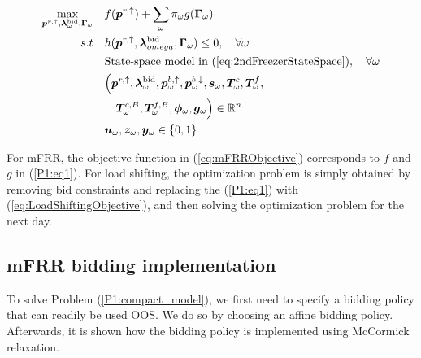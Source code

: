 \begin{subequations}\label{P1:compact_model}
    \begin{align}
        \underset{\bm{p}^{r,\uparrow}, \bm{\lambda}_{\omega}^{\text{bid}}, \bm{\Gamma}_{\omega}}{\textrm{max}} \quad & f(\bm{p}^{r,\uparrow}) + \sum_{\omega} \pi_{\omega} g(\bm{\Gamma}_{\omega}) \label{P1:eq1}
        \\
        s.t \quad                                                                                                    & h(\bm{p}^{r,\uparrow}, \bm{\lambda}_{omega}^{\text{bid}}, \bm{\Gamma}_{\omega}) \leq 0, \quad \forall{\omega}\label{P1:eq2}                                                                     \\
        \quad                                                                                                        & \text{State-space model in } (\ref{eq:2ndFreezerStateSpace}), \quad \forall{\omega} \label{P1:eq3}
        \\
        \quad                                                                                                        & \Bigl( \bm{p}^{r,\uparrow}, \bm{\lambda}_{\omega}^{\text{bid}}, \bm{p}_{\omega}^{b,\uparrow}, \bm{p}_{\omega}^{b,\downarrow}, \bm{s}_{\omega}, \bm{T}_{\omega}^{c}, \bm{T}_{\omega}^{f}, \notag \\ \quad & \quad \bm{T}_{\omega}^{c, B}, \bm{T}_{\omega}^{f,B}, \bm{\phi}_{\omega}, \bm{g}_{\omega} \Bigr) \in \mathbb{R}^{n}  \label{P1:eq4}
        \\
        \quad                                                                                                        & \bm{u}_{\omega}, \bm{z}_{\omega}, \bm{y}_{\omega} \in \{0,1\}  \label{P1:eq5}
    \end{align}
\end{subequations}

For mFRR, the objective function in (\ref{eq:mFRRObjective}) corresponds to $f$ and $g$ in (\ref{P1:eq1}). For load shifting, the optimization problem is simply obtained by removing bid constraints and replacing the (\ref{P1:eq1}) with (\ref{eq:LoadShiftingObjective}), and then solving the optimization problem for the next day.


\subsection{mFRR bidding implementation}\label{sec:mFRR_bidding_implementation}

To solve Problem (\ref{P1:compact_model}), we first need to specify a bidding policy that can readily be used OOS. We do so by choosing an affine bidding policy. Afterwards, it is shown how the bidding policy is implemented using McCormick relaxation.

